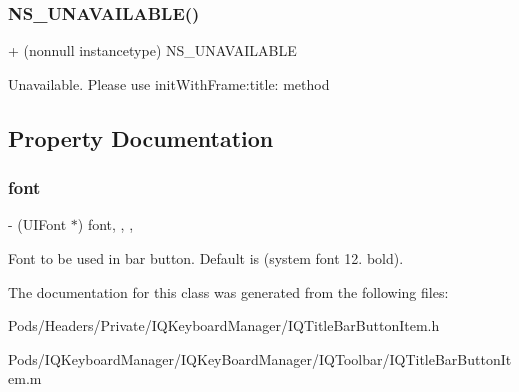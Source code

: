 \subsubsection{\texorpdfstring{N\+S\+\_\+\+U\+N\+A\+V\+A\+I\+L\+A\+B\+L\+E()}{NS\_UNAVAILABLE()}\hspace{0.1cm}{\footnotesize\ttfamily [6/6]}}
{\footnotesize\ttfamily + (nonnull instancetype) N\+S\+\_\+\+U\+N\+A\+V\+A\+I\+L\+A\+B\+LE \begin{DoxyParamCaption}{ }\end{DoxyParamCaption}}

Unavailable. Please use init\+With\+Frame\+:title\+: method 

\subsection{Property Documentation}
\mbox{\label{interface_i_q_title_bar_button_item_ad4fb524377edb9b2f494bf47a8d7c613}} 
\subsubsection{\texorpdfstring{font}{font}}
{\footnotesize\ttfamily -\/ (U\+I\+Font $\ast$) font\hspace{0.3cm}{\ttfamily [read]}, {\ttfamily [write]}, {\ttfamily [nonatomic]}, {\ttfamily [strong]}}

Font to be used in bar button. Default is (system font 12. bold). 

The documentation for this class was generated from the following files\+:\begin{DoxyCompactItemize}
\item 
Pods/\+Headers/\+Private/\+I\+Q\+Keyboard\+Manager/I\+Q\+Title\+Bar\+Button\+Item.\+h\item 
Pods/\+I\+Q\+Keyboard\+Manager/\+I\+Q\+Key\+Board\+Manager/\+I\+Q\+Toolbar/I\+Q\+Title\+Bar\+Button\+Item.\+m\end{DoxyCompactItemize}
